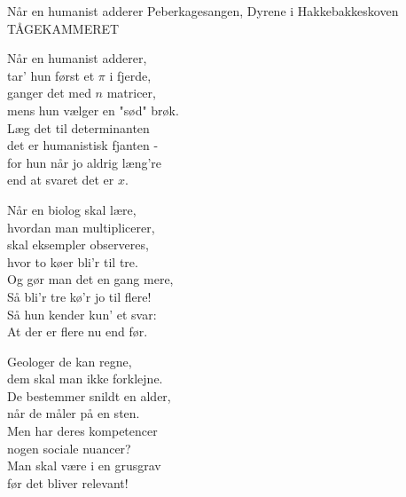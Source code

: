 \begin{song}{Når en humanist adderer}
  {} %
  {Peberkagesangen, Dyrene i Hakkebakkeskoven} %
  {TÅGEKAMMERET} %
  {} %
  {\NotCCLIed} %

  \begin{SBVerse}
    Når en humanist adderer,\\
    tar’ hun først et $\pi$ i fjerde,\\
    ganger det med $n$ matricer,\\
    mens hun vælger en "sød" brøk.\\
    Læg det til determinanten\\
    det er humanistisk fjanten -\\
    for hun når jo aldrig læng’re\\
    end at svaret det er $x$.
  \end{SBVerse}

  \begin{SBVerse}
    Når en biolog skal lære,\\
    hvordan man multiplicerer,\\
    skal eksempler observeres,\\
    hvor to køer bli’r til tre.\\
    Og gør man det en gang mere,\\
    Så bli’r tre kø’r jo til flere!\\
    Så hun kender kun’ et svar:\\
    At der er flere nu end før.
  \end{SBVerse}

  \begin{SBVerse}
    Geologer de kan regne,\\
    dem skal man ikke forklejne.\\
    De bestemmer snildt en alder,\\
    når de måler på en sten.\\
    Men har deres kompetencer\\
    nogen sociale nuancer?\\
    Man skal være i en grusgrav\\
    før det bliver relevant!
  \end{SBVerse}


\end{song}
